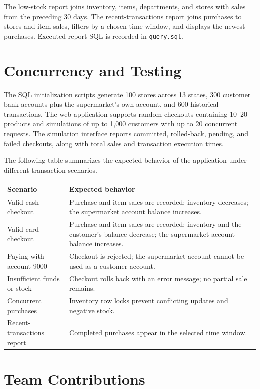\documentclass[11pt,letterpaper]{article}
\begin{document}
The low-stock report joins inventory, items, departments, and stores with sales from the preceding 30 days. The recent-transactions report joins purchases to stores and item sales, filters by a chosen time window, and displays the newest purchases. Executed report SQL is recorded in \texttt{query.sql}.

\section{Concurrency and Testing}


The SQL initialization scripts generate 100 stores across 13 states, 300 customer bank accounts plus the supermarket's own account, and 600 historical transactions. The web application supports random checkouts containing 10--20 products and simulations of up to 1,000 customers with up to 20 concurrent requests. The simulation interface reports committed, rolled-back, pending, and failed checkouts, along with total sales and transaction execution times.



The following table summarizes the expected behavior of the application under different transaction scenarios.


\begin{center}
\small
\begin{tabularx}{\textwidth}{@{}p{}X@{}}
\hline
Scenario & Expected behavior \\ \hline
Valid cash checkout & Purchase and item sales are recorded; inventory decreases; the supermarket account balance increases. \\
Valid card checkout & Purchase and item sales are recorded; inventory and the customer's balance decrease; the supermarket account balance increases. \\
Paying with account 9000 & Checkout is rejected; the supermarket account cannot be used as a customer account. \\
Insufficient funds or stock & Checkout rolls back with an error message; no partial sale remains. \\
Concurrent purchases & Inventory row locks prevent conflicting updates and negative stock. \\
Recent-transactions report & Completed purchases appear in the selected time window. \\ \hline
\end{tabularx}
\end{center}


\section{Team Contributions}
\end{document}
